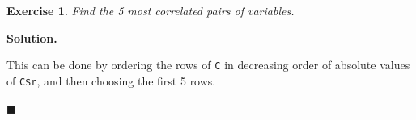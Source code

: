 \documentclass[10pt,b5paper,krantz1]{krantz}
\newenvironment{Shaded}{\begin{snugshade}}{\end{snugshade}}
\newcommand{\DataTypeTok}[1]{\textcolor[rgb]{0.27,0.27,0.27}{#1}}
\newcommand{\DecValTok}[1]{\textcolor[rgb]{0.06,0.06,0.06}{#1}}
\newcommand{\KeywordTok}[1]{\textcolor[rgb]{0.27,0.27,0.27}{\textbf{#1}}}
\newcommand{\NormalTok}[1]{#1}
\newcommand{\OperatorTok}[1]{\textcolor[rgb]{0.43,0.43,0.43}{\textbf{#1}}}
\newcommand{\OtherTok}[1]{\textcolor[rgb]{0.37,0.37,0.37}{#1}}
\newcommand{\StringTok}[1]{\textcolor[rgb]{0.5,0.5,0.5}{#1}}
\newtheorem{exercise}{Exercise}[chapter]
\newenvironment{solution}{%
\bigskip\noindent\textbf{Solution. }%
\it\ignorespaces%
\ignorespaces%
}{\ignorespaces%
\hfill$\blacksquare$%
}
\begin{document}
\begin{exercise}

Find the 5 most correlated pairs of variables.

\end{exercise}

\begin{solution}

This can be done by ordering the rows of \texttt{C} in decreasing
order of absolute values of \texttt{C\$r}, and then choosing the first 5 rows.

\begin{Shaded}
\end{Shaded}


\end{solution}
\end{document}
